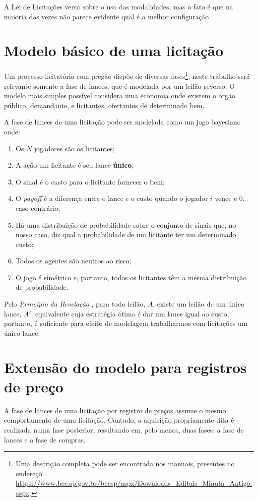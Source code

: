 A Lei de Licitações versa sobre o uso das modalidades, mas o fato é que na maioria das vezes não parece evidente qual é a melhor configuração \citep[p. 62]{pellegrini2018:MSc}.

\section{Modelo básico de uma licitação}
Um processo licitatório com pregão dispõe de diversas fases\footnote{Uma descrição completa pode ser encontrada nos manuais, presentes no endereço \url{https://www.bec.sp.gov.br/becsp/aspx/Downloads_Editais_Minuta_Antigo.aspx}.}, neste trabalho será relevante somente a fase de lances, que é modelada por um leilão reverso. O modelo mais simples possível considera uma economia onde existem o órgão público, demandante, e licitantes, ofertantes de determinado bem. 

A fase de lances de uma licitação pode ser modelada como um jogo bayesiano \citep{barbosa2013, Bugarin2022} onde:
\begin{enumerate}
    \item Os $N$ jogadores são os licitantes;
    \item A ação um licitante é seu lance \textbf{único};
    \item O sinal é o custo para o licitante fornecer o bem;
    \item O \emph{payoff} é a diferença entre o lance e o custo quando o jogador $i$ vence e 0, caso contrário;
    \item Há uma distribuição de probabilidade sobre o conjunto de sinais que, no nosso caso, diz qual a probabilidade de um licitante ter um determinado custo;
    \item Todos os agentes são neutros ao risco;
    \item O jogo é simétrico e, portanto, todos os licitantes têm a mesma distribuição de probabilidade.
\end{enumerate}

Pelo \emph{Princípio da Revelação} \citep{karlin2017game}, para todo leilão, $A$, existe um leilão de um único lance, $A'$, equivalente cuja estratégia ótima é dar um lance igual ao custo, portanto, é suficiente para efeito de modelagem trabalharmos com licitações um único lance.

\section{Extensão do modelo para registros de preço}
A fase de lances de uma licitação por registro de preços assume o mesmo comportamento de uma licitação. Contudo, a aquisição propriamente dita é realizada numa fase posterior, resultando em, pelo menos, duas fases: a fase de lances e a fase de compras.

